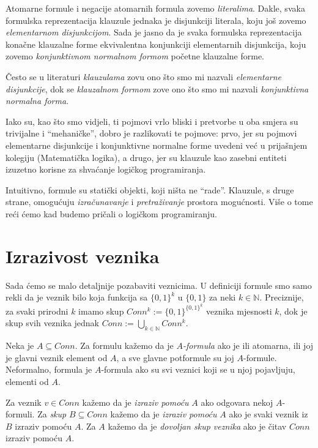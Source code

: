 \begin{definicija}
	Atomarne formule i negacije atomarnih formula zovemo \emph{literalima}.
	Dakle, svaka formulska reprezentacija klauzule jednaka je disjunkciji literala, koju još zovemo \emph{elementarnom disjunkcijom}. Sada je jasno da je svaka formulska reprezentacija konačne klauzalne forme ekvivalentna konjunkciji elementarnih disjunkcija, koju zovemo \emph{konjunktivnom normalnom formom} početne klauzalne forme.
\end{definicija}

\begin{napomena}
	Često se u literaturi \emph{klauzulama} zovu ono što smo mi nazvali \emph{elementarne disjunkcije}, dok se \emph{klauzalnom formom} zove ono što smo mi nazvali \emph{konjunktivna normalna forma}. 
	
	Iako su, kao što smo vidjeli, ti pojmovi vrlo bliski i pretvorbe u oba smjera su trivijalne i \enquote{mehaničke}, dobro je razlikovati te pojmove: prvo, jer su pojmovi elementarne disjunkcije i konjunktivne normalne forme uvedeni već u prijašnjem kolegiju (Matematička logika), a drugo, jer su klauzule kao zasebni entiteti izuzetno korisne za shvaćanje logičkog programiranja.
	
	Intuitivno, formule su statički objekti, koji ništa ne \enquote{rade}. Klauzule, s druge strane, omogućuju \emph{izračunavanje} i \emph{pretraživanje} prostora mogućnosti. Više o tome reći ćemo kad budemo pričali o logičkom programiranju.
\end{napomena}

\section{Izrazivost veznika}
Sada ćemo se malo detaljnije pozabaviti veznicima. U definiciji formule smo samo rekli da je veznik bilo koja funkcija sa $\{0,1\}^k$ u $\{0,1\}$ za neki $k\in\mathbb N$. Preciznije, za svaki prirodni $k$ imamo skup $Conn^k:=\{0,1\}^{\{0,1\}^k}$ veznika mjesnosti $k$, dok je skup svih veznika jednak $Conn:=\bigcup_{k\in\mathbb N}Conn^k$.

\begin{definicija}
Neka je $A\subseteq Conn$. Za formulu kažemo da je $A$\emph{-formula} ako je ili atomarna, ili joj je glavni veznik element od $A$, a sve glavne potformule su joj $A$-formule. Neformalno, formula je $A$-formula ako su svi veznici koji se u njoj pojavljuju, elementi od $A$.
	
Za veznik $v\in Conn$ kažemo da je \emph{izraziv pomoću} $A$ ako odgovara nekoj $A$-formuli. Za \emph{skup} $B\subseteq Conn$ kažemo da je \emph{izraziv pomoću} $A$ ako je svaki veznik iz $B$ izraziv pomoću $A$. Za $A$ kažemo da je \emph{dovoljan skup veznika} ako je čitav $Conn$ izraziv pomoću $A$.
\end{definicija}

